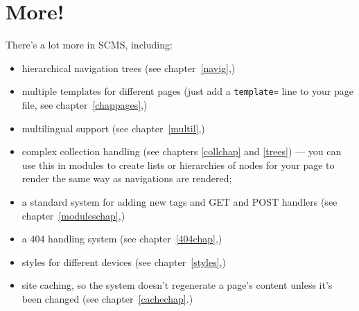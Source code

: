 \section{More!}
There's a lot more in SCMS, including:
\begin{itemize}
\item hierarchical navigation trees (see chapter~\ref{navig},)
\item multiple templates for different pages (just add a \texttt{template=} line to your page file, see
chapter~\ref{chappages},)
\item multilingual support (see chapter~\ref{multil},)
\item complex collection handling (see chapters \ref{collchap} and \ref{trees}) --- you can use
this in modules to create lists or hierarchies of nodes for your page to render the same way as navigations
are rendered;
\item a standard system for adding new tags and GET and POST handlers (see chapter~\ref{moduleschap},)
\item a 404 handling system (see chapter~\ref{404chap},)
\item styles for different devices (see chapter~\ref{styles},)
\item site caching, so the system doesn't regenerate a page's content unless it's been changed (see
chapter~\ref{cachechap}.)
\end{itemize}

